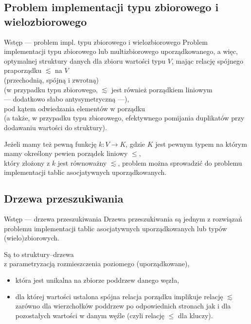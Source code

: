 \documentclass{beamer}
\begin{document}
\subsection{Problem implementacji typu zbiorowego i wielozbiorowego}
\begin{frame}{Wstęp --- problem impl. typu zbiorowego i wielozbiorowego}
Problem implementacji typu zbiorowego lub multizbiorowego uporządkowanego,
a więc, optymalnej struktury danych dla zbioru wartości typu $V$,
mając relację spójnego praporządku $\lesssim$ na $V$ ~\\ (przechodnią, spójną i zwrotną) ~ \\
(w przypadku typu zbiorowego, 
$\lesssim$ jest również porządkiem liniowym\\ --- dodatkowo słabo antysymetryczną ---),\\
pod kątem odwiedzania elementów w porządku ~\\
(a także, w przypadku typu zbiorowego, efektywnego pomijania duplikatów przy dodawaniu
wartości do struktury).

Jeżeli mamy też pewną funkcję $k : V \rightarrow K$, gdzie $K$ jest pewnym typem
na którym mamy określony pewien porządek liniowy $\leq$, \\
który złożony z $k$ jest równoważny $\lesssim$,
problem można sprowadzić do problemu implementacji tablic asocjatywnych uporządkowanych.
\end{frame}

\subsection{Drzewa przeszukiwania}

\begin{frame}{Wstęp --- drzewa przeszukiwania}
Drzewa przeszukiwania są jednym z rozwiązań 
problemu implementacji tablic asocjatywnych uporządkowanych
lub typów (wielo)zbiorowych.

\vspace{0.3cm}
Są to struktury--drzewa \\
z parametryzacją rozmieszczenia poziomego (uporządkowane),
\begin{itemize}
\item która jest unikalna na zbiorze poddrzew danego węzła, 
\item dla której wartości ustalona spójna relacja porządku
implikuje relację $\lesssim$ zarówno dla wierzchołków poddrzew
po odpowiednich stronach jak i dla pozostałych wartości w danym węźle
(czyli relację $\leq$ dla kluczy).
\end{itemize}
\end{frame}
\end{document}
